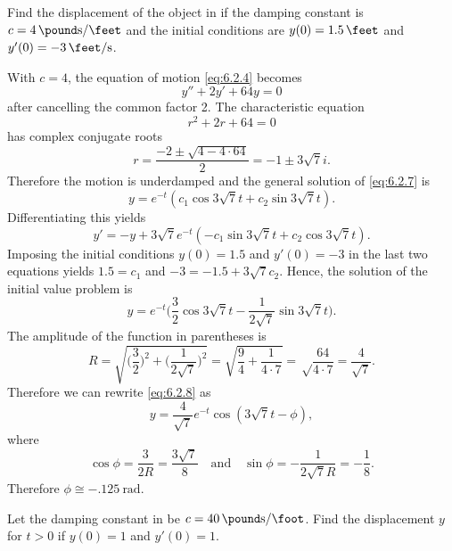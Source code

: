 \begin{example}
\label{example:6.2.2}
Find the displacement of the object in  if the
damping constant is $c=\qty{4}{\pound\second\per\feet}$ and the initial conditions are
$y(0)=\qty{1.5}{\feet}$ and $y'(0)=\qty{-3}{\feet\per\second}$.
\end{example}


\begin{solution}
With $c=4$, the equation of motion \eqref{eq:6.2.4} becomes
\begin{equation}\label{eq:6.2.7}
y''+2y'+64y=0
\end{equation}
after cancelling the common factor 2. The characteristic equation
\[
r^2+2r+64=0
\]
has complex conjugate roots
\[
r=\frac{-2\pm\sqrt{4-4\cdot64}}{2}=-1\pm3\sqrt7i.
\]
Therefore the motion is underdamped and the
general solution of  \eqref{eq:6.2.7} is
\[
y=e^{-t}(c_1\cos3\sqrt7t+c_2\sin3\sqrt7t).
\]
Differentiating this yields
\[
y'=-y+3\sqrt7e^{-t}(-c_1\sin3\sqrt7t+c_2\cos3\sqrt7t).
\]
Imposing the initial conditions $y(0)=1.5$ and $y'(0)=-3$ in the last
two equations yields $1.5=c_1$ and $-3=-1.5+3\sqrt7c_2$. Hence, the
solution of the initial value problem is
\begin{equation}\label{eq:6.2.8}
y=e^{-t}\bigg(\frac{3}{2}\cos3\sqrt7t-\frac{1}{2\sqrt7}
\sin3\sqrt7t\bigg).
\end{equation}
 The amplitude of the function in parentheses is
\[
 R=\sqrt{\bigg(\frac{3}{2}\bigg)^2+\bigg(\frac{1}{2\sqrt7}\bigg)^2}
=\sqrt{\frac{9}{4}+\frac{1}{4\cdot7}}
=\sqrt\frac{64}{4\cdot7}=\frac{4}{\sqrt7}.
\]
Therefore we can rewrite  \eqref{eq:6.2.8} as
\[
y=\frac{4}{\sqrt7}e^{-t}\cos(3\sqrt7t-\phi),
\]
 where
\[
\cos\phi=\frac{3}{2R}=\frac{3\sqrt7}{8}\quad\text{and}\quad \sin\phi=-\frac{1}{2\sqrt7R}=
-\frac{1}{8}.
\]
Therefore $\phi\cong\qty{-.125}{\radian}$.
\end{solution}

\begin{example}\label{example:6.2.3}
Let the damping constant in  be $c=\qty{40}{\pound\second\per\foot}$. Find the
displacement $y$ for $t>0$ if $y(0)=1$ and $y'(0)=1$.
\end{example}

